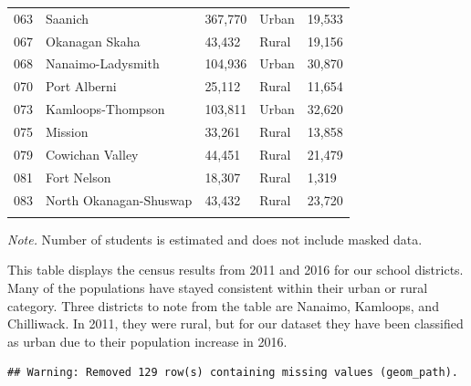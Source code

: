 \documentclass[
  english,
  man]{apa6}
\begin{document}
\begin{table}[tbp]
\begin{center}
\begin{threeparttable}
\begin{tabular}{lllll}
063 & Saanich & 367,770 & Urban & 19,533\\
067 & Okanagan Skaha & 43,432 & Rural & 19,156\\
068 & Nanaimo-Ladysmith & 104,936 & Urban & 30,870\\
070 & Port Alberni & 25,112 & Rural & 11,654\\
073 & Kamloops-Thompson & 103,811 & Urban & 32,620\\
075 & Mission & 33,261 & Rural & 13,858\\
079 & Cowichan Valley & 44,451 & Rural & 21,479\\
081 & Fort Nelson & 18,307 & Rural & 1,319\\
083 & North Okanagan-Shuswap & 43,432 & Rural & 23,720\\
\bottomrule
\addlinespace
\end{tabular}

\begin{tablenotes}[para]
\normalsize{\textit{Note.} Number of students is estimated and does not include masked data.}
\end{tablenotes}

\end{threeparttable}
\end{center}

\end{table}

This table displays the census results from 2011 and 2016 for our school districts. Many of the populations have stayed consistent within their urban or rural category. Three districts to note from the table are Nanaimo, Kamloops, and Chilliwack. In 2011, they were rural, but for our dataset they have been classified as urban due to their population increase in 2016.

\begin{verbatim}
## Warning: Removed 129 row(s) containing missing values (geom_path).
\end{verbatim}
\end{document}
